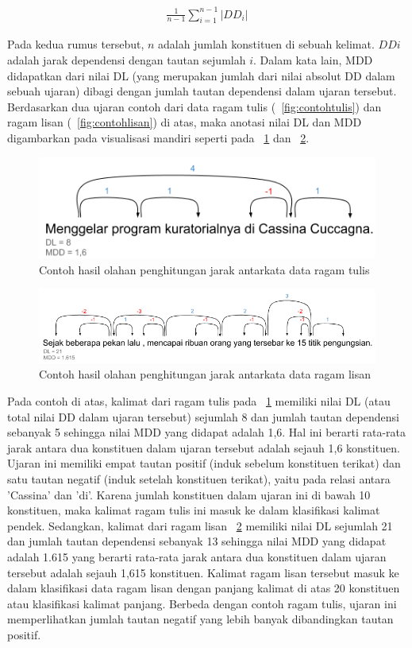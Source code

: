 \noindent \begin{align}\label{eq:bola}
	\frac{1}{n-1} \displaystyle\sum_{i=1}^{n-1} |DD_i|
\end{align}

Pada kedua rumus tersebut, $n$ adalah jumlah konstituen di sebuah kelimat. $DDi$ adalah jarak dependensi dengan tautan sejumlah $i$. Dalam kata lain, MDD didapatkan dari nilai DL (yang merupakan jumlah dari nilai absolut DD dalam sebuah ujaran) dibagi dengan jumlah tautan dependensi dalam ujaran tersebut. Berdasarkan dua ujaran contoh dari data ragam tulis (\pic~\ref{fig:contohtulis}) dan ragam lisan (\pic~\ref{fig:contohlisan}) di atas, maka anotasi nilai DL dan MDD digambarkan pada visualisasi mandiri seperti pada \pic~\ref{fig:contohtulis_DLMDD} dan \pic~\ref{fig:contohlisan_DLMDD}.

\begin{figure}
	\centering \includegraphics[width=0.5
	\textwidth] {pics/contohtulis_DLMDD.png} \caption{Contoh hasil olahan penghitungan jarak antarkata data ragam tulis} 
\label{fig:contohtulis_DLMDD} 
\end{figure}

\begin{figure}
	\centering \includegraphics[width=0.85
	\textwidth] {pics/contohlisan_DLMDD.png} \caption{Contoh hasil olahan penghitungan jarak antarkata data ragam lisan} 
\label{fig:contohlisan_DLMDD} 
\end{figure}

Pada contoh di atas, kalimat dari ragam tulis pada \pic~\ref{fig:contohtulis_DLMDD} memiliki nilai DL (atau total nilai DD dalam ujaran tersebut) sejumlah 8 dan jumlah tautan dependensi sebanyak 5 sehingga nilai MDD yang didapat adalah 1,6. Hal ini berarti rata-rata jarak antara dua konstituen dalam ujaran tersebut adalah sejauh 1,6 konstituen. Ujaran ini memiliki empat tautan positif (induk sebelum konstituen terikat) dan satu tautan negatif (induk setelah konstituen terikat), yaitu pada relasi antara 'Cassina' dan 'di'. Karena jumlah konstituen dalam ujaran ini di bawah 10 konstituen, maka kalimat ragam tulis ini masuk ke dalam klasifikasi kalimat pendek. Sedangkan, kalimat dari ragam lisan \pic~\ref{fig:contohlisan_DLMDD} memiliki nilai DL sejumlah 21 dan jumlah tautan dependensi sebanyak 13 sehingga nilai MDD yang didapat adalah 1.615 yang berarti rata-rata jarak antara dua konstituen dalam ujaran tersebut adalah sejauh 1,615 konstituen. Kalimat ragam lisan tersebut masuk ke dalam klasifikasi data ragam lisan dengan panjang kalimat di atas 20 konstituen atau klasifikasi kalimat panjang. Berbeda dengan contoh ragam tulis, ujaran ini memperlihatkan jumlah tautan negatif yang lebih banyak dibandingkan tautan positif.

